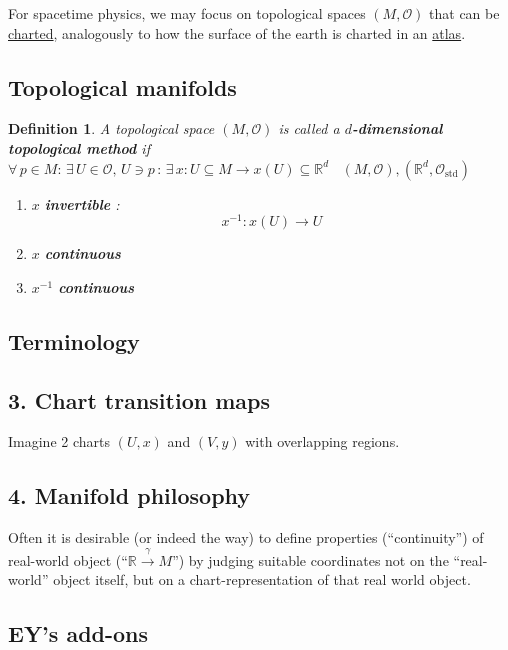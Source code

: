 \documentclass[10pt]{amsart}
\newtheorem{definition}{Definition}
\begin{document}
\begin{multicols*}{2}
For spacetime physics, we may focus on topological spaces $(M,\mathcal{O})$ that can be \underline{charted}, analogously to how the surface of the earth is charted in an \underline{atlas}.

\subsection{Topological manifolds}

\begin{definition}
	A topological space $(M,\mathcal{O})$ is called a \textbf{$d$-dimensional topological method} if \\
	$\forall \, p \in M : \, \exists \, U \in \mathcal{O}, \, U \ni p \, : \, \exists \, x : U \subseteq M \to x(U) \subseteq \mathbb{R}^d$  \quad \quad \, $(M,\mathcal{O}), ( \mathbb{R}^d , \mathcal{O}_{\text{std}})$ 
	\begin{enumerate}
		\item[(i)] $x$ \textbf{ invertible }: 
		\[
		x^{-1}:x(U) \to U
		\]
		\item[(ii)] $x$ \textbf{ continuous }
		\item[(iii)] $x^{-1}$ \textbf{ continuous }
	\end{enumerate}
\end{definition}

\subsection{Terminology}

\subsection{3. Chart transition maps}

Imagine 2 charts $(U,x)$ and $(V,y)$ with overlapping regions.  

\subsection{4. Manifold philosophy}

Often it is desirable (or indeed the way) to define properties (``continuity'') of real-world object (``$\mathbb{R}\xrightarrow{ \gamma } M$'') by judging suitable coordinates not on the ``real-world'' object itself, but on a chart-representation of that real world object.  

\subsection*{EY's add-ons}


\end{multicols*}
\end{document}
